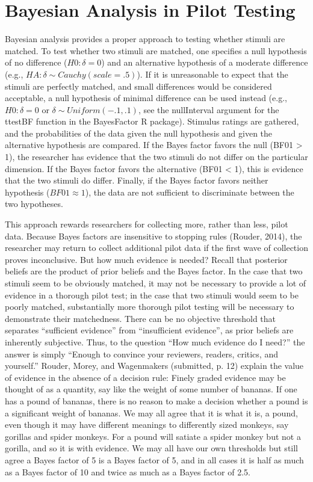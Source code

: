 \documentclass{article}
\begin{document}
\section{Bayesian Analysis in Pilot Testing}
Bayesian analysis provides a proper approach to testing whether stimuli are matched. To test whether two stimuli are matched, one specifies a null hypothesis of no difference ($H0: \delta{} = 0$) and an alternative hypothesis of a moderate difference (e.g., $HA: \delta{} \sim{} Cauchy(scale = .5)$). If it is unreasonable to expect that the stimuli are perfectly matched, and small differences would be considered acceptable, a null hypothesis of minimal difference can be used instead (e.g., $H0: \delta{} = 0$ or $\delta{} \sim{} Uniform(-.1, .1)$, see the nullInterval argument for the ttestBF function in the BayesFactor R package). Stimulus ratings are gathered, and the probabilities of the data given the null hypothesis and given the alternative hypothesis are compared. If the Bayes factor favors the null (BF01 > 1), the researcher has evidence that the two stimuli do not differ on the particular dimension. If the Bayes factor favors the alternative (BF01 < 1), this is evidence that the two stimuli do differ. Finally, if the Bayes factor favors neither hypothesis ($BF01 \approx 1$), the data are not sufficient to discriminate between the two hypotheses.
 
This approach rewards researchers for collecting more, rather than less, pilot data. Because Bayes factors are insensitive to stopping rules (Rouder, 2014), the researcher may return to collect additional pilot data if the first wave of collection proves inconclusive. But how much evidence is needed? Recall that posterior beliefs are the product of prior beliefs and the Bayes factor. In the case that two stimuli seem to be obviously matched, it may not be necessary to provide a lot of evidence in a thorough pilot test; in the case that two stimuli would seem to be poorly matched, substantially more thorough pilot testing will be necessary to demonstrate their matchedness.  There can be no objective threshold that separates “sufficient evidence” from “insufficient evidence”, as prior beliefs are inherently subjective. Thus, to the question “How much evidence do I need?” the answer is simply “Enough to convince your reviewers, readers, critics, and yourself.” Rouder, Morey, and Wagenmakers (submitted, p. 12) explain the value of evidence in the absence of a decision rule: 
Finely graded evidence may be thought of as a quantity, say like the weight of some number of bananas. If one has a pound of bananas, there is no reason to make a decision whether a pound is a significant weight of bananas. We may all agree that it is what it is, a pound, even though it may have different meanings to differently sized monkeys, say gorillas and spider monkeys. For a pound will satiate a spider monkey but not a gorilla, and so it is with evidence. We may all have our own thresholds but still agree a Bayes factor of 5 is a Bayes factor of 5, and in all cases it is half as much as a Bayes factor of 10 and twice as much as a Bayes factor of 2.5.
\end{document}
